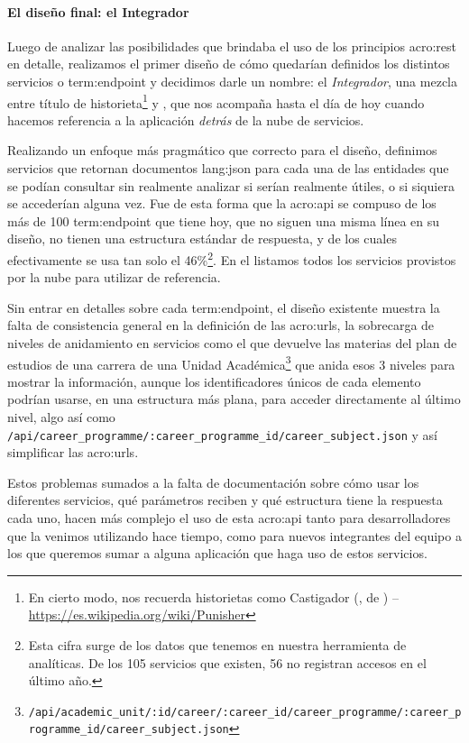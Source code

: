 \paragraph{El diseño final: el Integrador}

Luego de analizar las posibilidades que brindaba el uso de los principios \gls{acro:rest} en detalle, realizamos el primer diseño de cómo quedarían definidos los distintos servicios o \gls{term:endpoint} y decidimos darle un nombre: el \textit{Integrador}, una mezcla entre título de historieta\footnote{En cierto modo, nos recuerda historietas como Castigador (, de ) – \url{https://es.wikipedia.org/wiki/Punisher}} y , que nos acompaña hasta el día de hoy cuando hacemos referencia a la aplicación \textit{detrás} de la nube de servicios.

Realizando un enfoque más pragmático que correcto para el diseño, definimos servicios que retornan documentos \gls{lang:json} para cada una de las entidades que se podían consultar sin realmente analizar si serían realmente útiles, o si siquiera se accederían alguna vez. Fue de esta forma que la \gls{acro:api} se compuso de los más de 100 \gls{term:endpoint} que tiene hoy, que no siguen una misma línea en su diseño,  no tienen una estructura estándar de respuesta, y de los cuales efectivamente se usa tan solo el 46\%\footnote{Esta cifra surge de los datos que tenemos en nuestra herramienta de analíticas. De los 105 servicios que existen, 56 no registran accesos en el último año.}. En el  listamos todos los servicios provistos por la nube para utilizar de referencia.

Sin entrar en detalles sobre cada \gls{term:endpoint}, el diseño existente muestra la falta de consistencia general en la definición de las \glspl{acro:url}, la sobrecarga de niveles de anidamiento en servicios como el que devuelve las materias del plan de estudios de una carrera de una Unidad Académica\footnote{\lstinline$/api/academic_unit/:id/career/:career_id/career_programme/:career_programme_id/career_subject.json$} que anida esos 3 niveles para mostrar la información, aunque los identificadores únicos de cada elemento podrían usarse, en una estructura más plana, para acceder directamente al último nivel, algo así como \lstinline$/api/career_programme/:career_programme_id/career_subject.json$ y así simplificar las \glspl{acro:url}.

Estos problemas sumados a la falta de documentación sobre cómo usar los diferentes servicios, qué parámetros reciben y qué estructura tiene la respuesta cada uno, hacen más complejo el uso de esta \gls{acro:api} tanto para desarrolladores que la venimos utilizando hace tiempo, como para nuevos integrantes del equipo a los que queremos sumar a alguna aplicación que haga uso de estos servicios.

